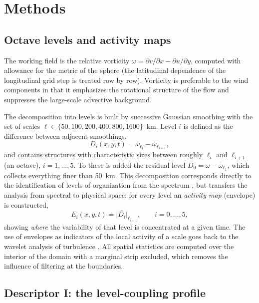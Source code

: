\documentclass[11pt,a4paper]{article}
\begin{document}
\section{Methods}
\label{sec:methods}

\subsection{Octave levels and activity maps}

The working field is the relative vorticity $\omega=\partial v/\partial x-\partial u/\partial y$, computed with allowance for the metric of the sphere (the latitudinal dependence of the longitudinal grid step is treated row by row). Vorticity is preferable to the wind components in that it emphasizes the rotational structure of the flow and suppresses the large-scale advective background.

The decomposition into levels is built by successive Gaussian smoothing with the set of scales $\ell\in\{50,100,200,400,800,1600\}$~km. Level $i$ is defined as the difference between adjacent smoothings,
\begin{equation}
D_i(x,y,t)=\overline{\omega}_{\ell_i}-\overline{\omega}_{\ell_{i+1}},
\end{equation}
and contains structures with characteristic sizes between roughly $\ell_i$ and $\ell_{i+1}$ (an octave), $i=1,\dots,5$. To these is added the residual level $D_0=\omega-\overline{\omega}_{\ell_1}$, which collects everything finer than 50~km. This decomposition corresponds directly to the identification of levels of organization from the spectrum \cite{Krenke2019}, but transfers the analysis from spectral to physical space: for every level an \emph{activity map} (envelope) is constructed,
\begin{equation}
E_i(x,y,t)=\overline{\lvert D_i\rvert}_{\ell_{i+1}},\qquad i=0,\dots,5,
\end{equation}
showing \emph{where} the variability of that level is concentrated at a given time. The use of envelopes as indicators of the local activity of a scale goes back to the wavelet analysis of turbulence \cite{Farge1992}. All spatial statistics are computed over the interior of the domain with a marginal strip excluded, which removes the influence of filtering at the boundaries.

\subsection{Descriptor I: the level-coupling profile}
\end{document}
